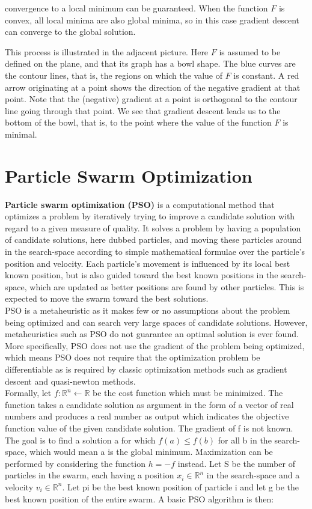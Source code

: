 \documentclass[11pt, a4paper]{report}
\begin{document}
convergence to a local minimum can be guaranteed. When the function $ F $ is convex, all local minima are also global minima, so in this case gradient descent can converge to the global solution.

This process is illustrated in the adjacent picture. Here $ F $ is assumed to be defined on the plane, and that its graph has a bowl shape. The blue curves are the contour lines, that is, the regions on which the value of $ F $ is constant. A red arrow originating at a point shows the direction of the negative gradient at that point. Note that the (negative) gradient at a point is orthogonal to the contour line going through that point. We see that gradient descent leads us to the bottom of the bowl, that is, to the point where the value of the function $ F $ is minimal.
\cite{wiki:gradientDescent}

\section{Particle Swarm Optimization}
\textbf{Particle swarm optimization (PSO)} is a computational method that optimizes a problem by iteratively trying to improve a candidate solution with regard to a given measure of quality. It solves a problem by having a population of candidate solutions, here dubbed particles, and moving these particles around in the search-space according to simple mathematical formulae over the particle's position and velocity. Each particle's movement is influenced by its local best known position, but is also guided toward the best known positions in the search-space, which are updated as better positions are found by other particles. This is expected to move the swarm toward the best solutions. \\


PSO is a metaheuristic as it makes few or no assumptions about the problem being optimized and can search very large spaces of candidate solutions. However, metaheuristics such as PSO do not guarantee an optimal solution is ever found. More specifically, PSO does not use the gradient of the problem being optimized, which means PSO does not require that the optimization problem be differentiable as is required by classic optimization methods such as gradient descent and quasi-newton methods. \\

Formally, let $ f: \mathbb{R}^{n} \gets \mathbb{R} $ be the cost function which must be minimized. The function takes a candidate solution as argument in the form of a vector of real numbers and produces a real number as output which indicates the objective function value of the given candidate solution. The gradient of f is not known. The goal is to find a solution a for which $ f(a) \leq f(b) $ for all b in the search-space, which 
would mean a is the global minimum. Maximization can be performed by considering the function $ h = -f $ instead.
Let S be the number of particles in the swarm, each having a position $ x_{i} \in \mathbb{R}^{n} $ in the search-space and a velocity $ v_{i} \in \mathbb{R}^{n} $. Let pi be the best known position of particle i and let g be the best known position of the entire swarm. A basic PSO algorithm is then:
\end{document}
